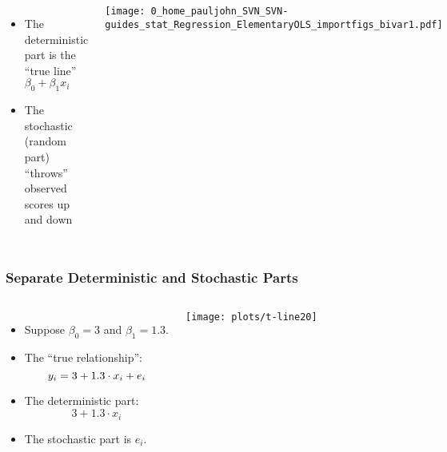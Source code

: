 \documentclass[10pt,english]{beamer}
\def\lyxframeend{} %
\newenvironment{topcolumns}{\begin{columns}[t]}{\end{columns}}
\begin{document}
\lyxframeend{}
\begin{topcolumns}%


\column{4cm}
\begin{itemize}
\item The deterministic part is the ``true line'' $\beta_{0}+\beta_{1}x_{i}$
\item The stochastic (random part) ``throws'' observed scores up and down
\end{itemize}

\column{6cm}


\begin{center}
\texttt{[image: 0\_home\_pauljohn\_SVN\_SVN-guides\_stat\_Regression\_ElementaryOLS\_importfigs\_bivar1.pdf]}
\par\end{center}

\end{topcolumns}%

\lyxframeend{}

\begin{frame}[containsverbatim]
\frametitle{Separate Deterministic and Stochastic Parts}
\begin{topcolumns}%


\column{6cm}
\begin{itemize}
\item Suppose $\beta_{0}=3$ and $\beta_{1}=1.3.$ 
\item The ``true relationship'':
\[
\mbox{\ensuremath{y_{i}}}=3+1.3\cdot x_{i}+e_{i}
\]

\item The deterministic part:
\[
3+1.3\cdot x_{i}
\]

\item The stochastic part is $e_{i}$.
\end{itemize}

\column{6cm}



\texttt{[image: plots/t-line20]}
\end{topcolumns}%
\end{frame}
\end{document}
